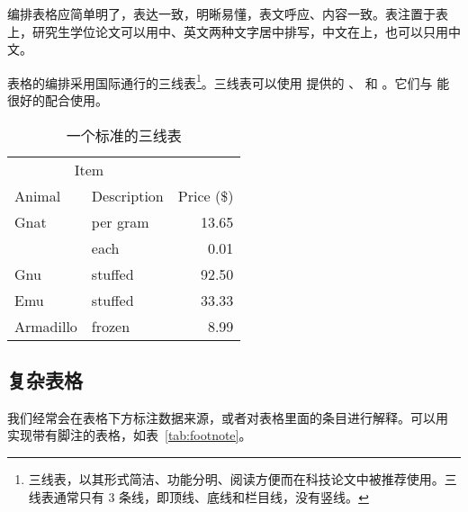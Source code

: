 编排表格应简单明了，表达一致，明晰易懂，表文呼应、内容一致。表注置于表上，研究生学位论文可以用中、英文两种文字居中排写，中文在上，也可以只用中文。

表格的编排采用国际通行的三线表\footnote{三线表，以其形式简洁、功能分明、阅读方便而在科技论文中被推荐使用。三线表通常只有 3 条线，即顶线、底线和栏目线，没有竖线。}。三线表可以使用  提供的 、 和 。它们与  能很好的配合使用。

\begin{table}[!htp]
  \centering
  \caption[一个标准的三线表]{一个标准的三线表\footnotemark}
  \label{tab:firstone}
  \begin{tabular}{llr}  
    \toprule
    \multicolumn{2}{c}{Item} \\
    \cmidrule(r){1-2}
    Animal    & Description & Price (\$) \\
    \midrule
    Gnat      & per gram    & 13.65      \\
              &    each     & 0.01       \\
    Gnu       & stuffed     & 92.50      \\
    Emu       & stuffed     & 33.33      \\
    Armadillo & frozen      & 8.99       \\
    \bottomrule
  \end{tabular}
\end{table}
  
\subsection{复杂表格}

我们经常会在表格下方标注数据来源，或者对表格里面的条目进行解释。可以用 实现带有脚注的表格，如表~\ref{tab:footnote}。

